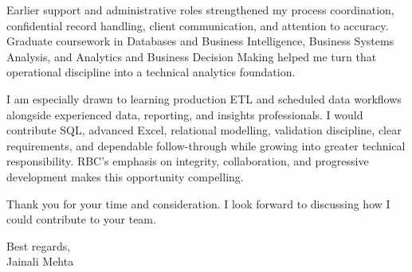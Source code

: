 \documentclass[letterpaper,10pt]{article}
\begin{document}
Earlier support and administrative roles strengthened my process coordination, confidential record handling, client communication, and attention to accuracy. Graduate coursework in Databases and Business Intelligence, Business Systems Analysis, and Analytics and Business Decision Making helped me turn that operational discipline into a technical analytics foundation.

I am especially drawn to learning production ETL and scheduled data workflows alongside experienced data, reporting, and insights professionals. I would contribute SQL, advanced Excel, relational modelling, validation discipline, clear requirements, and dependable follow-through while growing into greater technical responsibility. RBC's emphasis on integrity, collaboration, and progressive development makes this opportunity compelling.

Thank you for your time and consideration. I look forward to discussing how I could contribute to your team.

Best regards,\\[8pt]
Jainali Mehta
\end{document}
